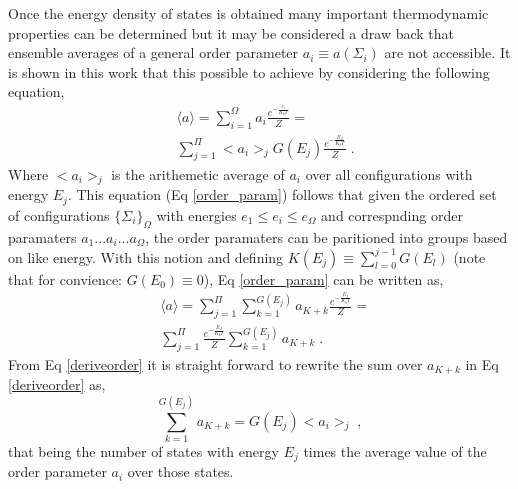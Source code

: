 \documentclass[aps,prl,reprint,superscriptaddress,showkeys]{revtex4-1}
\begin{document}
 Once the energy density of states is obtained many important thermodynamic properties can be determined but it may be considered a draw back that ensemble averages of a general order parameter $a_i \equiv a(\Sigma_i)$ are not accessible.  It is shown in this work that this possible to achieve by considering the following equation, 
\begin{equation}
\begin{split}
&\langle a \rangle = \sum_{i=1}^{\Omega}a_i \frac{ e^{- \frac{e_i}{K_bT}  }}{Z} = \\
&\sum_{j=1}^{\Pi}<a_i>_{j}G(E_j)\frac{e^{-\frac{E_J}{K_bT} }}{Z} \; . 
\label{order_param}
\end{split} 
\end{equation}
Where $<a_i>_{j}$ is the arithemetic average of $a_i$ over all configurations with energy $E_j$. This equation (Eq \ref{order_param}) follows that given the ordered set of configurations $\{\Sigma_i\}_\Omega$ with energies $e_1 \leq e_i \leq e_\Omega$ and correspnding order paramaters $a_1 ... a_i ... a_\Omega$, the order paramaters can be paritioned into groups based on like energy. With this notion and defining  $K(E_j)\equiv \sum_{l=0}^{j-1}G(E_l)$ (note that for convience: $G(E_0)\equiv 0$), Eq \ref{order_param} can be written as,
\begin{equation}
\begin{split}
&\langle a \rangle =  \sum_{j=1}^{\Pi} \sum_{k=1}^{G(E_j)}a_{K+k} \frac{e^{-\frac{E_J}{K_bT} }}{Z} = \\
&   \sum_{j=1}^{\Pi} \frac{e^{-\frac{E_J}{K_bT} }}{Z} \sum_{k=1}^{G(E_j)}a_{K+k} \;. 
\end{split}
\label{deriveorder}
\end{equation}
From Eq \ref{deriveorder}  it is straight forward to rewrite the sum over $a_{K+k}$ in Eq \ref{deriveorder} as, 
\begin{equation}
\sum_{k=1}^{G(E_j)}a_{K+k} =  G(E_j)<a_i>_{j} \;, 
\end{equation}
that being the number of states with energy $E_j$ times the average value of the order parameter  $a_i$ over those states. 
\end{document}
